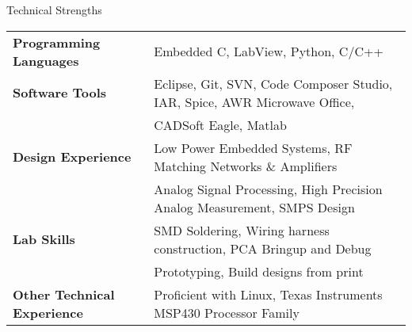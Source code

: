 \documentclass{resume} %
\begin{document}

\begin{rSection}{Technical Strengths}

\begin{tabular}{ @{} >{\bfseries}l @{\hspace{6ex}} l }
Programming Languages & Embedded C, LabView, Python, C/C++  \smallskip \\

Software Tools & Eclipse, Git, SVN, Code Composer Studio, IAR, Spice, AWR Microwave Office, \\
 & CADSoft Eagle, Matlab \smallskip \\

Design Experience & Low Power Embedded Systems, RF Matching Networks \& Amplifiers\\
 & Analog Signal Processing, High Precision Analog Measurement, SMPS Design \smallskip \\
 
Lab Skills & SMD Soldering, Wiring harness construction, PCA Bringup and Debug\\
 & Prototyping, Build designs from print\smallskip \\
 
Other Technical Experience & Proficient with Linux, Texas Instruments MSP430 Processor Family \\
\end{tabular}

\end{rSection}
\medskip
\end{document}
